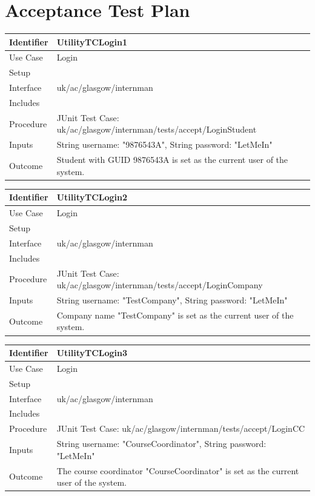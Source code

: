 \documentclass[11pt]{article}
\begin{document}
\newpage

\section{Acceptance Test Plan}

\begin{tabularx}{\textwidth}{|T|L|}
\hline
Identifier & UtilityTCLogin1\\
\hline
Use Case & Login\\
\hline
Setup &\\
\hline
Interface & uk/ac/glasgow/internman\\
\hline
Includes &\\
\hline
Procedure & JUnit Test Case: uk/ac/glasgow/internman/tests/accept/LoginStudent\\
\hline
Inputs & String username: "9876543A", String password: "LetMeIn"\\
\hline
Outcome & Student with GUID 9876543A is set as the current user of the system.\\
\hline
\end{tabularx}

\begin{tabularx}{\textwidth}{|T|L|}
\hline
Identifier & UtilityTCLogin2\\
\hline
Use Case & Login\\
\hline
Setup &\\
\hline
Interface & uk/ac/glasgow/internman\\
\hline
Includes &\\
\hline
Procedure & JUnit Test Case: uk/ac/glasgow/internman/tests/accept/LoginCompany\\
\hline
Inputs & String username: "TestCompany", String password: "LetMeIn"\\
\hline
Outcome & Company name "TestCompany" is set as the current user of the system.\\
\hline
\end{tabularx}

\begin{tabularx}{\textwidth}{|T|L|}
\hline
Identifier & UtilityTCLogin3\\
\hline
Use Case & Login\\
\hline
Setup &\\
\hline
Interface & uk/ac/glasgow/internman\\
\hline
Includes &\\
\hline
Procedure & JUnit Test Case: uk/ac/glasgow/internman/tests/accept/LoginCC\\
\hline
Inputs & String username: "CourseCoordinator", String password: "LetMeIn"\\
\hline
Outcome & The course coordinator "CourseCoordinator" is set as the current user 
of the system.\\
\hline
\end{tabularx}
\end{document}

